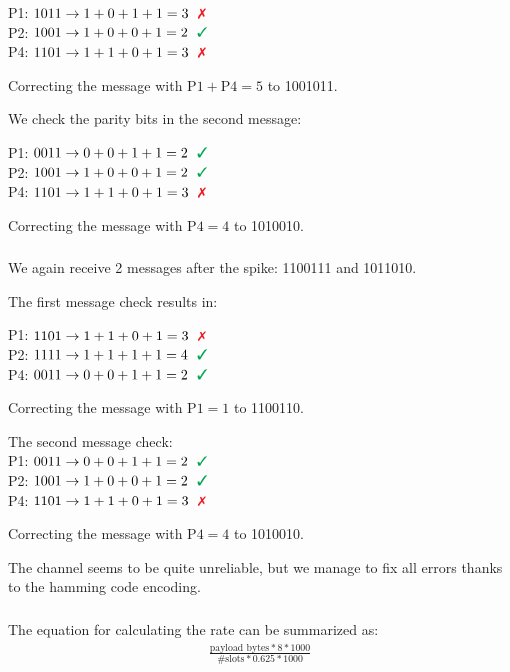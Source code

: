 \documentclass[12pt]{article}
\newcommand{\multipartexercise}{\addtocounter{subsection}{1}\setcounter{subsubsection}{0}}
\newcommand{\exercisepart}{\subsubsection{}}
\begin{document}
\noindent
P1: $1011 \rightarrow 1+0+1+1=3 \ \color{Red} \ \text{\ding{55}}$ \\
P2: $1001 \rightarrow 1+0+0+1=2 \ \color{Green} \ \text{\ding{51}}$ \\
P4: $1101 \rightarrow 1+1+0+1=3 \ \color{Red} \ \text{\ding{55}}$

\noindent
Correcting the message with $\text{P1} + \text{P4} = 5$ to 1001011.

\bigskip
\noindent
We check the parity bits in the second message:

\noindent
P1: $0011 \rightarrow 0+0+1+1=2 \ \color{Green} \ \text{\ding{51}}$ \\
P2: $1001 \rightarrow 1+0+0+1=2 \ \color{Green} \ \text{\ding{51}}$ \\
P4: $1101 \rightarrow 1+1+0+1=3 \ \color{Red} \ \text{\ding{55}}$

\noindent
Correcting the message with $\text{P4} = 4$ to 1010010.

\exercisepart
We again receive 2 messages after the spike: 1100111 and 1011010.

\bigskip
\noindent
The first message check results in:

\noindent
P1: $1101 \rightarrow 1+1+0+1=3 \ \color{Red} \ \text{\ding{55}}$ \\
P2: $1111 \rightarrow 1+1+1+1=4 \ \color{Green} \ \text{\ding{51}}$ \\
P4: $0011 \rightarrow 0+0+1+1=2 \ \color{Green} \ \text{\ding{51}}$

\noindent
Correcting the message with $\text{P1} = 1$ to 1100110.

\bigskip
\noindent
The second message check:
\\
P1: $0011 \rightarrow 0+0+1+1=2 \ \color{Green} \ \text{\ding{51}}$ \\
P2: $1001 \rightarrow 1+0+0+1=2 \ \color{Green} \ \text{\ding{51}}$ \\
P4: $1101 \rightarrow 1+1+0+1=3 \ \color{Red} \ \text{\ding{55}}$

\noindent
Correcting the message with $\text{P4} = 4$ to 1010010.

\bigskip

The channel seems to be quite unreliable, but we manage to fix all errors thanks to the hamming code encoding.

\multipartexercise
\exercisepart
The equation for calculating the rate can be summarized as:
\begin{align*}
  \frac{\text{payload bytes}*8*1000}{\text{\#slots}*0.625*1000}
\end{align*}
\end{document}
